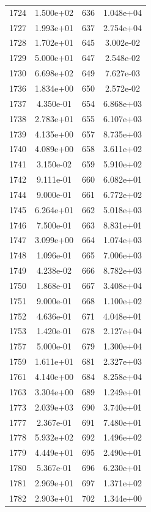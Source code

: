 \documentclass[12pt]{article}
\begin{document}
\begin{longtable}{@{}cccc@{}}
1724 & 1.500e+02 & 636 & 1.048e+04 \\
1727 & 1.993e+01 & 637 & 2.754e+04 \\
1728 & 1.702e+01 & 645 & 3.002e-02 \\
1729 & 5.000e+01 & 647 & 2.548e-02 \\
1730 & 6.698e+02 & 649 & 7.627e-03 \\
1736 & 1.834e+00 & 650 & 2.572e-02 \\
1737 & 4.350e-01 & 654 & 6.868e+03 \\
1738 & 2.783e+01 & 655 & 6.107e+03 \\
1739 & 4.135e+00 & 657 & 8.735e+03 \\
1740 & 4.089e+00 & 658 & 3.611e+02 \\
1741 & 3.150e-02 & 659 & 5.910e+02 \\
1742 & 9.111e-01 & 660 & 6.082e+01 \\
1744 & 9.000e-01 & 661 & 6.772e+02 \\
1745 & 6.264e+01 & 662 & 5.018e+03 \\
1746 & 7.500e-01 & 663 & 8.831e+01 \\
1747 & 3.099e+00 & 664 & 1.074e+03 \\
1748 & 1.096e-01 & 665 & 7.006e+03 \\
1749 & 4.238e-02 & 666 & 8.782e+03 \\
1750 & 1.868e-01 & 667 & 3.408e+04 \\
1751 & 9.000e-01 & 668 & 1.100e+02 \\
1752 & 4.636e-01 & 671 & 4.048e+01 \\
1753 & 1.420e-01 & 678 & 2.127e+04 \\
1757 & 5.000e-01 & 679 & 1.300e+04 \\
1759 & 1.611e+01 & 681 & 2.327e+03 \\
1761 & 4.140e+00 & 684 & 8.258e+04 \\
1763 & 3.304e+00 & 689 & 1.249e+01 \\
1773 & 2.039e+03 & 690 & 3.740e+01 \\
1777 & 2.367e-01 & 691 & 7.480e+01 \\
1778 & 5.932e+02 & 692 & 1.496e+02 \\
1779 & 4.449e+01 & 695 & 2.490e+01 \\
1780 & 5.367e-01 & 696 & 6.230e+01 \\
1781 & 2.969e+01 & 697 & 1.371e+02 \\
1782 & 2.903e+01 & 702 & 1.344e+00 \\

\bottomrule
\end{longtable}
\end{document}

